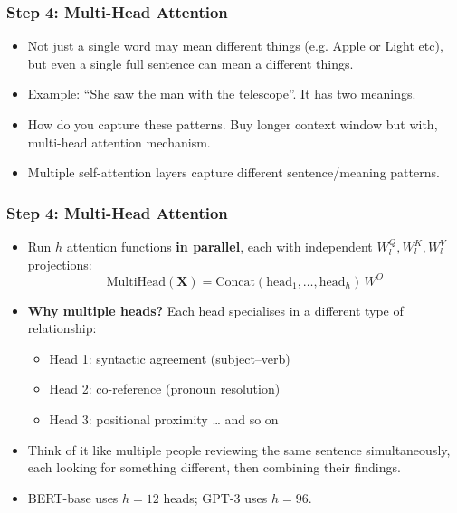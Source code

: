 \begin{frame}[fragile]\frametitle{Step 4: Multi-Head Attention}
\begin{itemize}
\item Not just a single word may mean different things (e.g. Apple or Light etc), but even a single full sentence can mean a different things.
\item Example: ``She saw the man with the telescope''. It has two meanings.
\item How do you capture these patterns. Buy longer context window but with, multi-head attention mechanism.
\item Multiple self-attention layers capture different sentence/meaning patterns.
\end{itemize}
\end{frame}


\begin{frame}[fragile]\frametitle{Step 4: Multi-Head Attention}
\begin{itemize}
\item Run $h$ attention functions \textbf{in parallel}, each with independent $W^Q_l, W^K_l, W^V_l$ projections:
\[
  \text{MultiHead}(\mathbf{X}) = \text{Concat}(\text{head}_1, \ldots, \text{head}_h)\,W^O
\]
\item \textbf{Why multiple heads?} Each head specialises in a different type of relationship:
  \begin{itemize}
  \item Head 1: syntactic agreement (subject–verb)
  \item Head 2: co-reference (pronoun resolution)
  \item Head 3: positional proximity … and so on
  \end{itemize}
\item Think of it like multiple people reviewing the same sentence simultaneously, each looking for something different,  then combining their findings.
\item BERT-base uses $h=12$ heads; GPT-3 uses $h=96$.
\end{itemize}
\end{frame}


